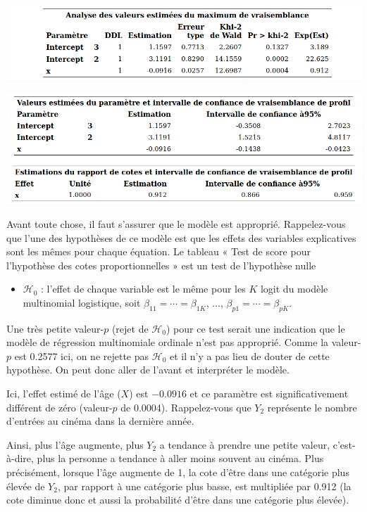 \documentclass[
  11pt,
  letterpaper,
]{book}
\providecommand{\tightlist}{%
  \setlength{\itemsep}{0pt}\setlength{\parskip}{0pt}}
\theoremstyle{definition}
\theoremstyle{definition}
\theoremstyle{definition}
\theoremstyle{definition}
\theoremstyle{remark}
\begin{document}
\begin{center}\includegraphics[width=0.8\linewidth]{figures/03-logistic-e29} \end{center}

\begin{center}\includegraphics[width=0.8\linewidth]{figures/03-logistic-e30} \end{center}

Avant toute chose, il faut s'assurer que le modèle est approprié. Rappelez-vous que l'une des hypothèses de ce modèle est que les effets des variables explicatives sont les mêmes pour chaque équation. Le tableau « Test de score pour l'hypothèse des cotes proportionnelles » est un test de l'hypothèse nulle

\begin{itemize}
\tightlist
\item
  \(\mathcal{H}_0\) : l'effet de chaque variable est le même pour les \(K\) logit du modèle multinomial logistique, soit \(\beta_{11} = \cdots =\beta_{1K}\), \(\ldots\), \(\beta_{p1} = \cdots =\beta_{pK}\).
\end{itemize}

Une très petite valeur-\(p\) (rejet de \(\mathcal{H}_0\)) pour ce test serait une indication que le modèle de régression multinomiale ordinale n'est pas approprié. Comme la valeur-\(p\) est 0.2577 ici, on ne rejette pas \(\mathcal{H}_0\) et il n'y a pas lieu de douter de cette hypothèse. On peut donc aller de l'avant et interpréter le modèle.

Ici, l'effet estimé de l'âge (\(X\)) est \(-{0.0916}\) et ce paramètre est significativement différent de zéro (valeur-\(p\) de 0.0004). Rappelez-vous que \(Y_2\) représente le nombre d'entrées au cinéma dans la dernière année.

Ainsi, plus l'âge augmente, plus \(Y_2\) a tendance à prendre une petite valeur, c'est-à-dire, plus la personne a tendance à aller moins souvent au cinéma. Plus précisément, lorsque l'âge augmente de 1, la cote d'être dans une catégorie plus élevée de \(Y_2\), par rapport à une catégorie plus basse, est multipliée par 0.912 (la cote diminue donc et aussi la probabilité d'être dans une catégorie plus élevée).
\end{document}
